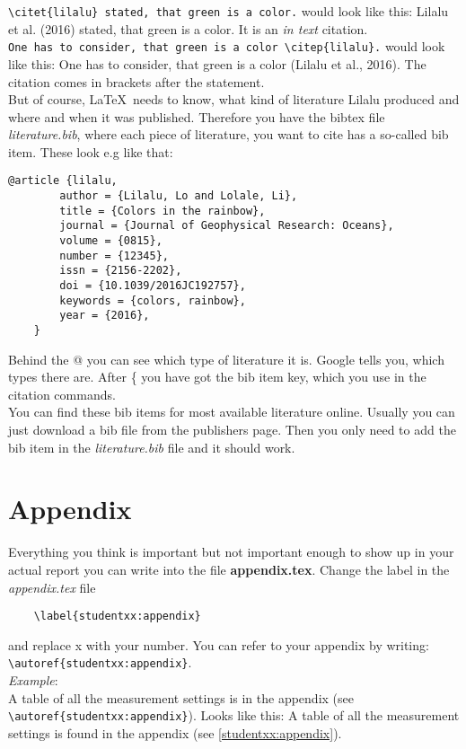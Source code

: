 \documentclass[12pt,a4paper,notitlepage]{scrreprt}
\begin{document}
\verb#\citet{lilalu} stated, that green is a color.# would look like this: Lilalu et al. (2016) stated, that green is a color. It is an \textit{in text} citation.\\

\verb#One has to consider, that green is a color \citep{lilalu}.# would look like this: One has to consider, that green is a color (Lilalu et al., 2016). The citation comes in brackets after the statement.\\

But of course, \LaTeX\ needs to know, what kind of literature Lilalu produced and where and when it was published. Therefore you have the bibtex file \textit{literature.bib}, where each piece of literature, you want to cite has a so-called bib item. These look e.g like that:

\begin{verbatim}
@article {lilalu,
		author = {Lilalu, Lo and Lolale, Li},
		title = {Colors in the rainbow},
		journal = {Journal of Geophysical Research: Oceans},
		volume = {0815},
		number = {12345},
		issn = {2156-2202},
		doi = {10.1039/2016JC192757},
		keywords = {colors, rainbow},
		year = {2016},
	}
\end{verbatim}

Behind the @ you can see which type of literature it is. Google tells you, which types there are. After \{ you have got the bib item key, which you use in the citation commands.\\
You can find these bib items for most available literature online. Usually you can just download a bib file from the publishers page. Then you only need to add the bib item in the \textit{literature.bib} file and it should work.\\

\section{Appendix}
\label{studentxx:appendix}
Everything you think is important but not important enough to show up in your actual report you can write into the file \textbf{appendix.tex}. Change the label in the \textit{appendix.tex} file 
\begin{verbatim}
	\label{studentxx:appendix} 		
\end{verbatim}
and replace x with your number. You can refer to your appendix by writing:\\ \verb#\autoref{studentxx:appendix}#. \\\textit{Example}:\\
A table of all the measurement settings is in the appendix (see \verb#\autoref{studentxx:appendix}#). Looks like this: A table of all the measurement settings is found in the appendix (see \autoref{studentxx:appendix}).\\
\end{document}
